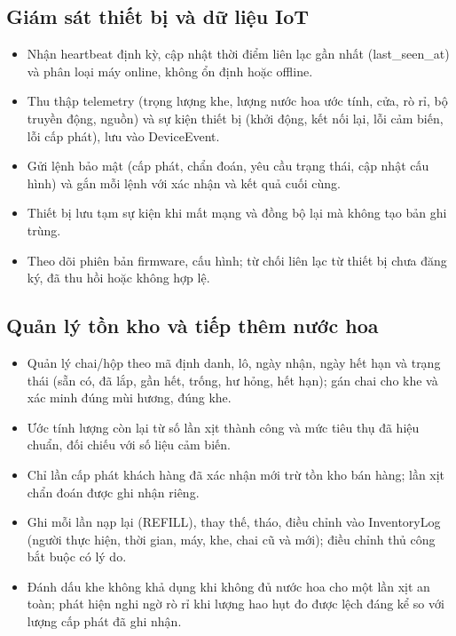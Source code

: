 \subsection{Giám sát thiết bị và dữ liệu IoT}
\begin{itemize}
  \item Nhận heartbeat định kỳ, cập nhật thời điểm liên lạc gần nhất (last\_seen\_at) và phân loại máy online, không ổn định hoặc offline.
  \item Thu thập telemetry (trọng lượng khe, lượng nước hoa ước tính, cửa, rò rỉ, bộ truyền động, nguồn) và sự kiện thiết bị (khởi động, kết nối lại, lỗi cảm biến, lỗi cấp phát), lưu vào DeviceEvent.
  \item Gửi lệnh bảo mật (cấp phát, chẩn đoán, yêu cầu trạng thái, cập nhật cấu hình) và gắn mỗi lệnh với xác nhận và kết quả cuối cùng.
  \item Thiết bị lưu tạm sự kiện khi mất mạng và đồng bộ lại mà không tạo bản ghi trùng.
  \item Theo dõi phiên bản firmware, cấu hình; từ chối liên lạc từ thiết bị chưa đăng ký, đã thu hồi hoặc không hợp lệ.
\end{itemize}
\subsection{Quản lý tồn kho và tiếp thêm nước hoa}
\begin{itemize}
  \item Quản lý chai/hộp theo mã định danh, lô, ngày nhận, ngày hết hạn và trạng thái (sẵn có, đã lắp, gần hết, trống, hư hỏng, hết hạn); gán chai cho khe và xác minh đúng mùi hương, đúng khe.
  \item Ước tính lượng còn lại từ số lần xịt thành công và mức tiêu thụ đã hiệu chuẩn, đối chiếu với số liệu cảm biến.
  \item Chỉ lần cấp phát khách hàng đã xác nhận mới trừ tồn kho bán hàng; lần xịt chẩn đoán được ghi nhận riêng.
  \item Ghi mỗi lần nạp lại (REFILL), thay thế, tháo, điều chỉnh vào InventoryLog (người thực hiện, thời gian, máy, khe, chai cũ và mới); điều chỉnh thủ công bắt buộc có lý do.
  \item Đánh dấu khe không khả dụng khi không đủ nước hoa cho một lần xịt an toàn; phát hiện nghi ngờ rò rỉ khi lượng hao hụt đo được lệch đáng kể so với lượng cấp phát đã ghi nhận.
\end{itemize}
